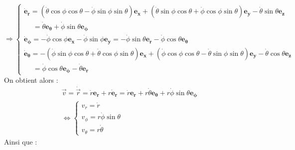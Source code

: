 \documentclass[a4paper,10pt,twoside]{article}
\begin{document}
\begin{equation*}
\Rightarrow
    \begin{cases}
         \mathbf{ \dot{e}_r} = (\dot \theta\cos{\phi}\cos{\theta}-\dot \phi\sin{\phi}\sin{\theta} )  \mathbf{ e_x}+
         (\dot\theta\sin{\phi}\cos{\theta}+\dot \phi\cos{\phi}\sin{\theta})\mathbf{ e_y}
         -\dot\theta\sin{\theta} \mathbf{ e_z} \\ \;\quad= \dot\theta\mathbf{ e_\theta}+\dot \phi \sin{\theta}\mathbf{ e_\phi}   \\
         \mathbf{ \dot{e}_\phi}=-\dot\phi\cos{\phi} \mathbf{ e_x}-\dot\phi\sin{\phi} \mathbf{ e_y}=-\dot\phi\sin{\theta}\mathbf{ e_r}  -\dot\phi\cos{\theta}\mathbf{e_\theta} \\
         \mathbf{ \dot{e}_\theta}= -(\dot\phi\sin{\phi}\cos{\theta}+\dot\theta\cos{\phi}\sin{\theta}) \mathbf{ e_x}+(\dot\phi\cos{\phi}\cos{\theta}-\dot\theta\sin{\phi}\sin{\theta}) \mathbf{ e_y}-\dot\theta\cos{\theta} \mathbf{ e_z}
         \\ \;\quad=\dot\phi\cos{\theta}\mathbf{ e_\phi}-\dot\theta\mathbf{ e_r}
    \end{cases}
\end{equation*}
On obtient alors : 
\begin{gather*}
    \vec v = \dot {\vec r} = \dot r \mathbf{ e_r}+r\mathbf{ \dot{e}_r}=\dot r \mathbf{ e_r}+r\dot\theta\mathbf{ e_\theta}+r\dot \phi \sin{\theta}\mathbf{ e_\phi} \\
    \iff \begin{cases}
         v_r = \dot r \\
         v_\phi = r\dot\phi\sin{\theta} \\
         v_\theta = r\dot\theta
    \end{cases}       
\end{gather*}
Ainsi que : 
\end{document}
